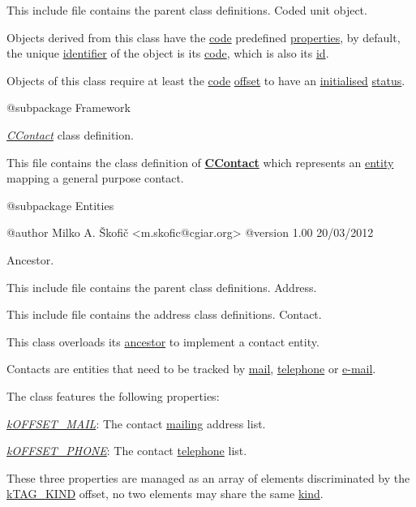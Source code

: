 This include file contains the parent class definitions. Coded unit object.

Objects derived from this class have the \hyperlink{}{code} predefined \hyperlink{}{properties}, by default, the unique \hyperlink{}{identifier} of the object is its \hyperlink{}{code}, which is also its \hyperlink{}{id}.

Objects of this class require at least the \hyperlink{}{code} \hyperlink{}{offset} to have an \hyperlink{}{initialised} \hyperlink{}{status}.

\begin{DoxyVerb} @subpackage        Framework\end{DoxyVerb}


{\itshape \hyperlink{class_c_contact}{C\-Contact}} class definition.

This file contains the class definition of {\bfseries \hyperlink{class_c_contact}{C\-Contact}} which represents an \hyperlink{class_c_entity}{entity} mapping a general purpose contact.

\begin{DoxyVerb} @subpackage        Entities

 @author            Milko A. Škofič <m.skofic@cgiar.org>
 @version   1.00 20/03/2012\end{DoxyVerb}


Ancestor.

This include file contains the parent class definitions. Address.

This include file contains the address class definitions. Contact.

This class overloads its \hyperlink{class_c_entity}{ancestor} to implement a contact entity.

Contacts are entities that need to be tracked by \hyperlink{}{mail}, \hyperlink{}{telephone} or \hyperlink{}{e-\/mail}.

The class features the following properties\-:


\begin{DoxyItemize}
\item {\itshape \hyperlink{}{k\-O\-F\-F\-S\-E\-T\-\_\-\-M\-A\-I\-L}}\-: The contact \hyperlink{}{mailing} address list. 
\item {\itshape \hyperlink{}{k\-O\-F\-F\-S\-E\-T\-\_\-\-P\-H\-O\-N\-E}}\-: The contact \hyperlink{}{telephone} list. 
\end{DoxyItemize}

These three properties are managed as an array of elements discriminated by the \hyperlink{}{k\-T\-A\-G\-\_\-\-K\-I\-N\-D} offset, no two elements may share the same \hyperlink{}{kind}.

